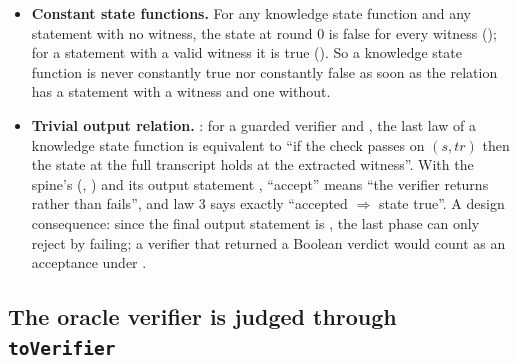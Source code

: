 \begin{itemize}
\item \textbf{Constant state functions.} For any knowledge state function and any statement with
  no witness, the state at round $0$ is false for every witness ();
  for a statement with a valid witness it is true (). So a knowledge
  state function is never constantly true nor constantly false as soon as the relation has a
  statement with a witness and one without.
\item \textbf{Trivial output relation.} : for a guarded verifier and
  , the last law of a knowledge state function is equivalent to \enquote{if
  the check passes on $(s, \mathit{tr})$ then the state at the full transcript holds at the
  extracted witness}. With the spine's  (,
  \allowbreak{}\allowbreak{}\allowbreak{}) and its output statement ,
  \enquote{accept} means \enquote{the verifier returns rather than fails}, and law 3 says exactly
  \enquote{accepted $\Rightarrow$ state true}. A design consequence: since the final output
  statement is , the last phase can only reject by failing; a verifier that returned a
  Boolean verdict would count  as an acceptance under .
\end{itemize}

\subsection{The oracle verifier is judged through \texorpdfstring{\texttt{toVerifier}}{toVerifier}}\label{sec:gen-lib-ark-toverifier}

